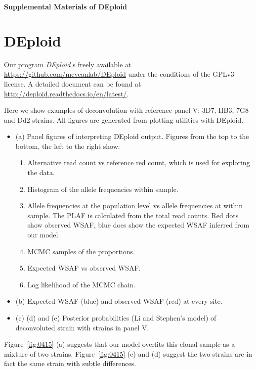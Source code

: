 

\begin{center}
\textbf{\large Supplemental Materials of DEploid}
\end{center}

\section{DEploid} \label{sup:sec:deploid}

Our program {\it DEploid } s freely available at \url{https://github.com/mcveanlab/DEploid} under the conditions of the GPLv3 license. A detailed document can be found at \url{http://deploid.readthedocs.io/en/latest/}.

Here we show examples of deconvolution with reference panel V: 3D7, HB3, 7G8 and Dd2 strains. All figures are generated from plotting utilities with {\textmd DEploid}.
\begin{itemize}
\item (a) Panel figures of interpreting {\textmd DEploid} output. Figures from the top to the bottom, the left to the right show:
\begin{enumerate}
\item Alternative read count vs reference red count, which is used for exploring the data. 
\item Histogram of the allele frequencies within sample.
\item Allele frequencies at the population level vs allele frequencies at within sample. The PLAF is calculated from the total read counts. Red dots show observed WSAF, blue does show the expected WSAF inferred from our model.
\item MCMC samples of the proportions.
\item Expected WSAF vs observed WSAF.
\item Log likelihood of the MCMC chain. 
\end{enumerate}
\item (b) Expected WSAF (blue) and observed WSAF (red) at every site.
\item (c) (d) and (e) Posterior probabilities (Li and Stephen's model) of deconvoluted strain with strains in panel V. 
\end{itemize}
Figure~\ref{fig:0415} (a) suggests that our model overfits this clonal sample as a mixture of two strains. Figure~\ref{fig:0415} (c) and (d) suggest the two strains are in fact the same strain with subtle differences. 

